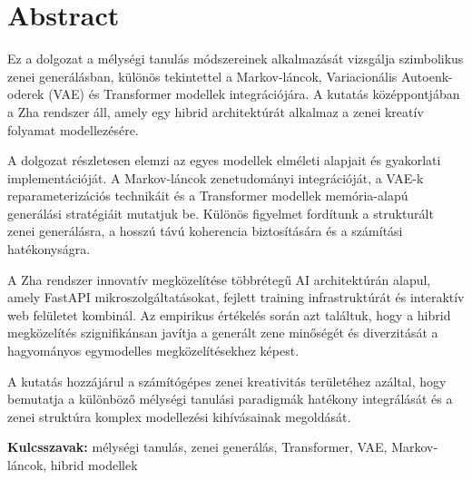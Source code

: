 \chapter*{Abstract}

Ez a dolgozat a mélységi tanulás módszereinek alkalmazását vizsgálja szimbolikus zenei generálásban, különös tekintettel a Markov-láncok, Variacionális Autoenk-oderek (VAE) és Transformer modellek integrációjára. A kutatás középpontjában a Zha rendszer áll, amely egy hibrid architektúrát alkalmaz a zenei kreatív folyamat modellezésére.

A dolgozat részletesen elemzi az egyes modellek elméleti alapjait és gyakorlati implementációját. A Markov-láncok zenetudományi integrációját, a VAE-k reparameterizációs technikáit és a Transformer modellek memória-alapú generálási stratégiáit mutatjuk be. Különös figyelmet fordítunk a strukturált zenei generálásra, a hosszú távú koherencia biztosítására és a számítási hatékonyságra.

A Zha rendszer innovatív megközelítése többrétegű AI architektúrán alapul, amely FastAPI mikroszolgáltatásokat, fejlett training infrastruktúrát és interaktív web felületet kombinál. Az empirikus értékelés során azt találtuk, hogy a hibrid megközelítés szignifikánsan javítja a generált zene minőségét és diverzitását a hagyományos egymodelles megközelítésekhez képest.

A kutatás hozzájárul a számítógépes zenei kreativitás területéhez azáltal, hogy bemutatja a különböző mélységi tanulási paradigmák hatékony integrálását és a zenei struktúra komplex modellezési kihívásainak megoldását.

\textbf{Kulcsszavak:} mélységi tanulás, zenei generálás, Transformer, VAE, Markov-láncok, hibrid modellek